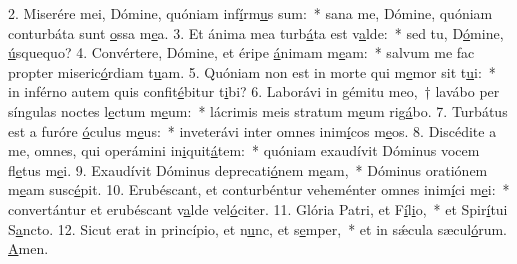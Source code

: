 2. Miserére mei, Dómine, quóniam inf\uline{í}rm\uline{u}s sum:~* sana me, Dómine, quóniam conturbáta sunt \uline{o}ssa m\uline{e}a.
3. Et ánima mea turb\uline{á}ta est v\uline{a}lde:~* sed tu, D\uline{ó}mine, \uline{ú}squequo?
4. Convértere, Dómine, et éripe \uline{á}nimam m\uline{e}am:~* salvum me fac propter miseric\uline{ó}rdiam t\uline{u}am.
5. Quóniam non est in morte qui m\uline{e}mor sit t\uline{u}i:~* in inférno autem quis confit\uline{é}bitur t\uline{i}bi?
6. Laborávi in gémitu meo,~† lavábo per síngulas noctes l\uline{e}ctum m\uline{e}um:~* lácrimis meis stratum m\uline{e}um rig\uline{á}bo.
7. Turbátus est a furóre \uline{ó}culus m\uline{e}us:~* inveterávi inter omnes inim\uline{í}cos m\uline{e}os.
8. Discédite a me, omnes, qui operámini in\uline{i}quit\uline{á}tem:~* quóniam exaudívit Dóminus vocem fl\uline{e}tus m\uline{e}i.
9. Exaudívit Dóminus deprecati\uline{ó}nem m\uline{e}am,~* Dóminus oratiónem m\uline{e}am susc\uline{é}pit.
10. Erubéscant, et conturbéntur veheménter omnes inim\uline{í}ci m\uline{e}i:~* convertántur et erubéscant v\uline{a}lde vel\uline{ó}citer.
11. Glória Patri, et F\uline{í}l\uline{i}o,~* et Spir\uline{í}tui S\uline{a}ncto.
12. Sicut erat in princípio, et n\uline{u}nc, et s\uline{e}mper,~* et in sǽcula sæcul\uline{ó}rum. \uline{A}men.
